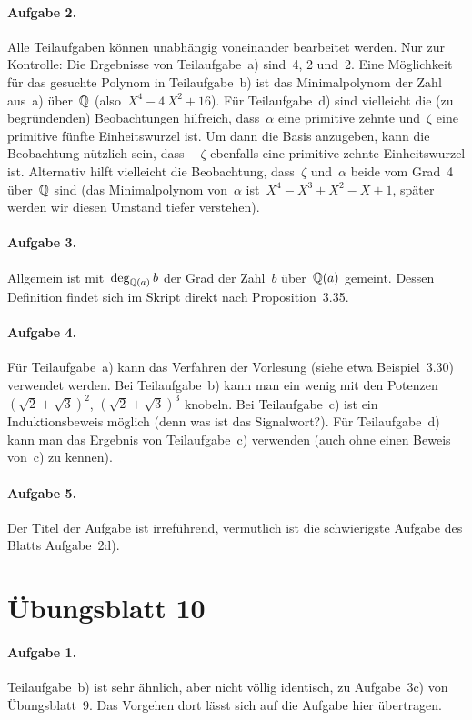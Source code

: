 \documentclass{../algblatt}
\begin{document}
\paragraph{Aufgabe 2.} Alle Teilaufgaben 
können unabhängig voneinander bearbeitet werden. Nur zur Kontrolle: Die
Ergebnisse von Teilaufgabe~a) sind~4, 2 und~2. Eine Möglichkeit für das
gesuchte Polynom in Teilaufgabe~b) ist das Minimalpolynom der Zahl aus~a)
über~$\mathbb{Q}$ (also~$X^4-4\,X^2+16$). Für Teilaufgabe~d) sind vielleicht die (zu begründenden)
Beobachtungen hilfreich, dass~$\alpha$ eine primitive zehnte und~$\zeta$ eine
primitive fünfte Einheitswurzel ist. Um dann die Basis anzugeben, kann die
Beobachtung nützlich sein, dass~$-\zeta$ ebenfalls eine primitive zehnte
Einheitswurzel ist. Alternativ hilft vielleicht die Beobachtung, dass~$\zeta$
und~$\alpha$ beide vom Grad~4 über~$\mathbb{Q}$ sind (das Minimalpolynom von~$\alpha$
ist~$X^4 - X^3 + X^2 - X + 1$, später werden wir diesen Umstand tiefer
verstehen).

\paragraph{Aufgabe 3.} Allgemein ist mit~$\deg_{\mathbb{Q}(a)} b$ der Grad der
Zahl~$b$ über~$\mathbb{Q}(a)$ gemeint. Dessen Definition findet sich im Skript direkt
nach Proposition~3.35.

\paragraph{Aufgabe 4.} Für Teilaufgabe~a) kann das Verfahren der
Vorlesung (siehe etwa Beispiel~3.30) verwendet werden. Bei Teilaufgabe~b) kann
man ein wenig mit den Potenzen~$(\sqrt{2}+\sqrt{3})^2$, $(\sqrt{2}+\sqrt{3})^3$
knobeln. Bei Teilaufgabe~c) ist
ein Induktionsbeweis möglich (denn was ist das Signalwort?). Für Teilaufgabe~d) kann man
das Ergebnis von Teilaufgabe~c) verwenden (auch ohne einen Beweis von~c) zu
kennen).

\paragraph{Aufgabe 5.} Der Titel der Aufgabe ist irreführend, vermutlich ist
die schwierigste Aufgabe des Blatts Aufgabe~2d).


\section*{Übungsblatt 10}

\paragraph{Aufgabe 1.} Teilaufgabe~b) ist sehr ähnlich, aber nicht völlig
identisch, zu Aufgabe~3c) von Übungsblatt~9. Das Vorgehen dort lässt sich auf
die Aufgabe hier übertragen.
\end{document}
